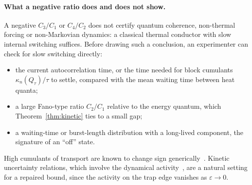 \documentclass[11pt,a4paper]{article}
\theoremstyle{remark}\newtheorem{remark}[theorem]{Remark}
\newcommand{\eps}{\varepsilon}
\begin{document}
\paragraph{What a negative ratio does and does not show.} A negative $C_3/C_1$ or $C_4/C_2$ does not certify quantum coherence, non-thermal forcing or non-Markovian dynamics: a classical thermal conductor with slow internal switching suffices. Before drawing such a conclusion, an experimenter can check for slow switching directly:
\begin{itemize}[nosep]
\item the current autocorrelation time, or the time needed for block cumulants $\kappa_n(Q_\tau)/\tau$ to settle, compared with the mean waiting time between heat quanta;
\item a large Fano-type ratio $C_2/C_1$ relative to the energy quantum, which Theorem~\ref{thm:kinetic} ties to a small gap;
\item a waiting-time or burst-length distribution with a long-lived component, the signature of an ``off'' state.
\end{itemize}
High cumulants of transport are known to change sign generically~\cite{Flindt2009}. Kinetic uncertainty relations, which involve the dynamical activity~\cite{DiTerlizziBaiesi2019}, are a natural setting for a repaired bound, since the activity on the trap edge vanishes as $\eps\to0$.
\end{document}
